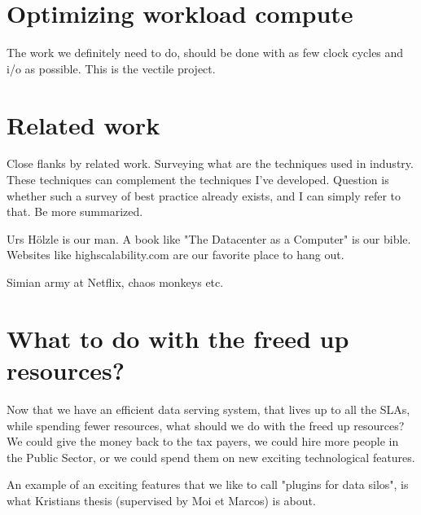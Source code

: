 \documentclass[11pt]{amsart}
\begin{document}
\section{Optimizing workload compute}
The work we definitely need to do, should be done with as few clock cycles and i/o as possible. This is the vectile project.

\section{Related work}

Close flanks by related work. Surveying what are the techniques used in industry. These techniques can complement the techniques I've developed. Question is whether such a survey of best practice already exists, and I can simply refer to that. Be more summarized.

Urs H{\"o}lzle is our man. A book like "The Datacenter as a Computer" is our bible. Websites like highscalability.com are our favorite place to hang out.

Simian army at Netflix, chaos monkeys etc. 

\section{What to do with the freed up resources?}
Now that we have an efficient data serving system, that lives up to all the SLAs, while spending fewer resources, what should we do with the freed up resources? We could give the money back to the tax payers, we could hire more people in the Public Sector, or we could spend them on new exciting technological features.

An example of an exciting features that we like to call "plugins for data silos", is what Kristians thesis (supervised by Moi et Marcos) is about.

\end{document}
